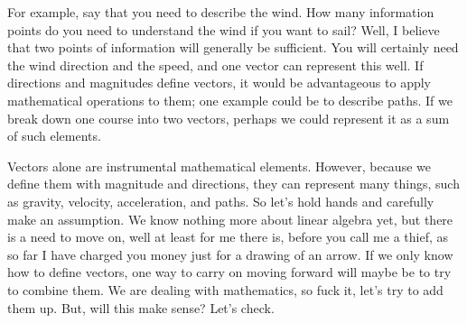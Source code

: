 \documentclass[a4,12pt,twosided,openany]{memoir}
\begin{document}
\par 
\indent
For example, say that you need to describe the wind. How many information points do you need to understand the wind if you want to sail? Well, I believe that two points of information will generally be sufficient. You will certainly need the wind direction and the speed, and one vector can represent this well. If directions and magnitudes define vectors, it would be advantageous to apply mathematical operations to them; one example could be to describe paths. If we break down one course into two vectors, perhaps we could represent it as a sum of such elements.
\par 
\indent
Vectors alone are instrumental mathematical elements. However, because we define them with magnitude and directions, they can represent many things, such as gravity, velocity, acceleration, and paths. So let’s hold hands and carefully make an assumption. We know nothing more about linear algebra yet, but there is a need to move on, well at least for me there is, before you call me a thief, as so far I have charged you money just for a drawing of an arrow. If we only know how to define vectors, one way to carry on moving forward will maybe be to try to combine them. We are dealing with mathematics, so fuck it, let’s try to add them up. But, will this make sense? Let’s check.
\end{document}
